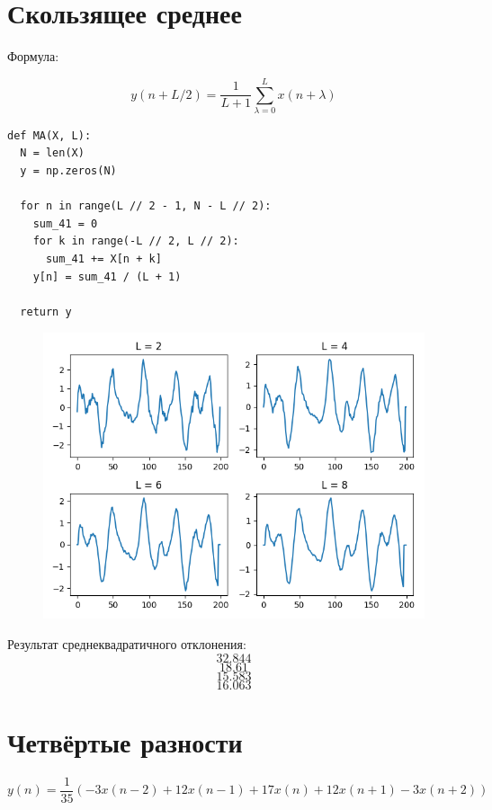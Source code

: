 \documentclass[12pt]{article}
\begin{document}
\section{Скользящее среднее}
Формула:

\[y(n + L / 2) = \frac{1}{L + 1}\sum_{\lambda=0}^{L}x(n+\lambda) \]
 


\begin{lstlisting}
def MA(X, L):
  N = len(X)
  y = np.zeros(N)

  for n in range(L // 2 - 1, N - L // 2):
    sum_41 = 0
    for k in range(-L // 2, L // 2):
      sum_41 += X[n + k]
    y[n] = sum_41 / (L + 1)

  return y
\end{lstlisting}



\begin{figure}[!htb]
\centering
\includegraphics[scale=1.00]{ma.png}
\caption{}
\label{}
\end{figure}

Результат среднеквадратичного отклонения:
\[ 32.844\]
\[ 18.61\]
\[ 15.583\]
\[ 16.063\]

       

\section{Четвёртые разности}

\[y(n) = \frac{1}{35}(-3x(n-2) + 12x(n-1) + 17x(n) + 12x(n+1) - 3x(n+2)) \]

\end{document}

